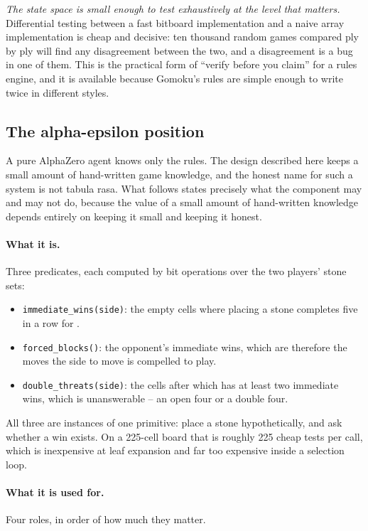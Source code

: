 \emph{The state space is small enough to test exhaustively at the level that
matters.} Differential testing between a fast bitboard implementation and a naive
array implementation is cheap and decisive: ten thousand random games compared
ply by ply will find any disagreement between the two, and a disagreement is a
bug in one of them. This is the practical form of ``verify before you claim'' for
a rules engine, and it is available because Gomoku's rules are simple enough to
write twice in different styles.

\subsection{The alpha-epsilon position}
\label{sec:alphaepsilon}

A pure AlphaZero agent knows only the rules. The design described here keeps a
small amount of hand-written game knowledge, and the honest name for such a
system is not tabula rasa. What follows states precisely what the component may
and may not do, because the value of a small amount of hand-written knowledge
depends entirely on keeping it small and keeping it honest.

\paragraph{What it is.} Three predicates, each computed by bit operations over
the two players' stone sets:

\begin{itemize}
  \item \texttt{immediate\_wins(side)}: the empty cells where placing a stone
        completes five in a row for .
  \item \texttt{forced\_blocks()}: the opponent's immediate wins, which are
        therefore the moves the side to move is compelled to play.
  \item \texttt{double\_threats(side)}: the cells after which  has at
        least two immediate wins, which is unanswerable -- an open four or a
        double four.
\end{itemize}

All three are instances of one primitive: place a stone hypothetically, and ask
whether a win exists. On a 225-cell board that is roughly 225 cheap tests per
call, which is inexpensive at leaf expansion and far too expensive inside a
selection loop.

\paragraph{What it is used for.} Four roles, in order of how much they matter.

